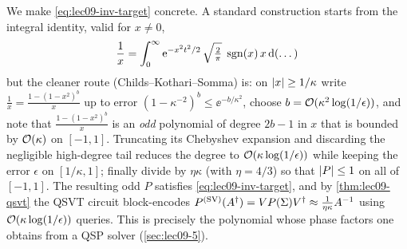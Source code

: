 \begin{example}[{Approximating $1/x$ on $[1/\kappa,1]$}]
\label{exa:lec09-inv}
We make \eqref{eq:lec09-inv-target} concrete. A standard construction starts from the
integral identity, valid for $x\neq0$,
\begin{equation}
  \frac1x=\int_0^\infty \mathrm{e}^{-x^2 t^2/2}\,\sqrt{\tfrac2\pi}\;\operatorname{sgn}(x)\,
     x\,\mathrm{d}(\text{\dots})
  \label{eq:lec09-int}
\end{equation}
but the cleaner route (Childs--Kothari--Somma) is: on $\left\lvert x \right\rvert\ge1/\kappa$ write
$\tfrac1x=\tfrac{1-(1-x^2)^{b}}{x}$ up to error $(1-\kappa^{-2})^b\le\ee^{-b/\kappa^2}$,
choose $b=\mathcal{O}(\kappa^2\log(1/\epsilon))$, and note that
$\tfrac{1-(1-x^2)^b}{x}$ is an \emph{odd} polynomial of degree $2b-1$ in $x$ that is
bounded by $\mathcal{O}(\kappa)$ on $[-1,1]$. Truncating its Chebyshev expansion and
discarding the negligible high-degree tail reduces the degree to $\mathcal{O}(\kappa\log
(1/\epsilon))$ while keeping the error $\epsilon$ on $[1/\kappa,1]$; finally divide by
$\eta\kappa$ (with $\eta=4/3$) so that $\left\lvert P \right\rvert\le1$ on all of $[-1,1]$. The resulting
odd $P$ satisfies \eqref{eq:lec09-inv-target}, and by \cref{thm:lec09-qsvt} the QSVT
circuit block-encodes $P^{(\mathrm{SV})}(A^{\dagger})=V P(\Sigma)V^{\dagger}\approx\tfrac1{\eta\kappa}
A^{-1}$ using $\mathcal{O}(\kappa\log(1/\epsilon))$ queries. This is precisely the polynomial
whose phase factors one obtains from a QSP solver (\cref{sec:lec09-5}).


\end{example}
